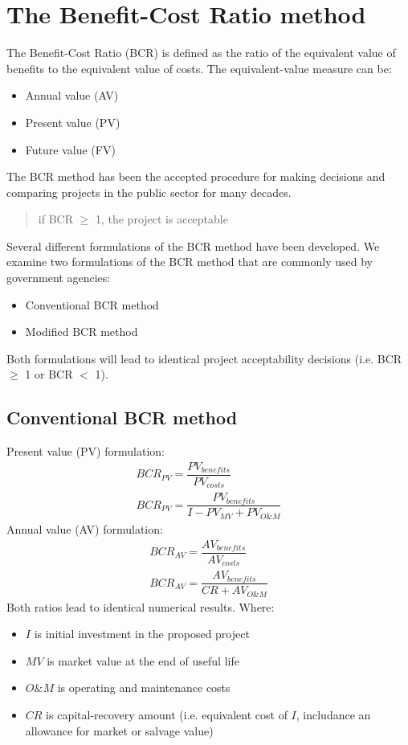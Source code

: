 \documentclass[class=report, crop=false, 12pt,a4paper]{standalone}
\begin{document}
\section{The Benefit-Cost Ratio method}
The Benefit-Cost Ratio (BCR) is defined as the ratio of the equivalent value of benefits to the equivalent value of costs. The equivalent-value measure can be:
\begin{itemize}
	\item Annual value (AV)
	\item Present value (PV)
	\item Future value (FV)
\end{itemize}
The BCR method has been the accepted procedure for making decisions and comparing projects in the public sector for many decades.
\begin{quote}
	if BCR $\geq$ 1, the project is acceptable
\end{quote}
Several different formulations of the BCR method have been developed. We examine two formulations of the BCR method that are commonly used by government agencies:
\begin{itemize}
	\item Conventional BCR method
	\item Modified BCR method
\end{itemize}
Both formulations will lead to identical project acceptability decisions (i.e. BCR $\geq$ 1 or BCR $<$ 1). 
\subsection{Conventional BCR method}
Present value (PV) formulation:
\begin{gather}
	BCR_{PV} = \dfrac{PV_{benefits}}{PV_{costs}}\\
	BCR_{PV} = \dfrac{PV_{benefits}}{I- PV_{MV}+PV_{O\&M}}
\end{gather}
Annual value (AV) formulation:
\begin{gather}
	BCR_{AV} = \dfrac{AV_{benefits}}{AV_{costs}}\\
	BCR_{AV} = \dfrac{AV_{benefits}}{CR + AV_{O\&M}}
\end{gather}
Both ratios lead to identical numerical results. Where:
\begin{itemize}
	\item $I$ is initial investment in the proposed project
	\item $MV$ is market value at the end of useful life
	\item $O\&M$ is operating and maintenance costs
	\item $CR$ is capital-recovery amount (i.e. equivalent cost of $I$, includance an allowance for market or salvage value)
\end{itemize}
\end{document}
